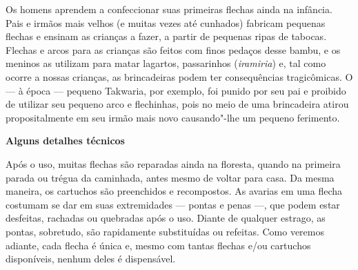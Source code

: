 Os homens aprendem a confeccionar suas primeiras flechas ainda na
infância. Pais e irmãos mais velhos (e muitas vezes até cunhados)
fabricam pequenas flechas e ensinam as crianças a fazer, a partir de
pequenas ripas de tabocas. Flechas e arcos para as crianças são feitos
com finos pedaços desse bambu, e os meninos as utilizam para matar
lagartos, passarinhos (\emph{iramiria}) e, tal como ocorre a nossas
crianças, as brincadeiras podem ter consequências tragicômicas. O --- à
época --- pequeno Takwaria, por exemplo, foi punido por seu pai e proibido
de utilizar seu pequeno arco e flechinhas, pois no meio de uma
brincadeira atirou propositalmente em seu irmão mais novo causando"-lhe
um pequeno ferimento.

\textbf{Alguns detalhes técnicos}

Após o uso, muitas flechas são reparadas ainda na floresta, quando na
primeira parada ou trégua da caminhada, antes mesmo de voltar para casa.
Da mesma maneira, os cartuchos são preenchidos e recompostos. As avarias
em uma flecha costumam se dar em suas extremidades --- pontas e penas ---,
que podem estar desfeitas, rachadas ou quebradas após o uso. Diante de
qualquer estrago, as pontas, sobretudo, são rapidamente substituídas ou
refeitas. Como veremos adiante, cada flecha é única e, mesmo com tantas
flechas e/ou cartuchos disponíveis, nenhum deles é dispensável.

